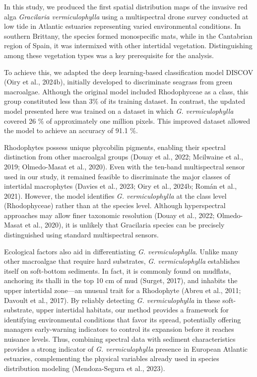 \documentclass[
  letterpaper,
  DIV=11,
  numbers=noendperiod]{scrartcl}
\begin{document}
In this study, we produced the first spatial distribution maps of the
invasive red alga \emph{Gracilaria vermiculophylla} using a
multispectral drone survey conducted at low tide in Atlantic estuaries
representing varied environmental conditions. In southern Brittany, the
species formed monospecific mats, while in the Cantabrian region of
Spain, it was intermixed with other intertidal vegetation.
Distinguishing among these vegetation types was a key prerequisite for
the analysis.

To achieve this, we adapted the deep learning-based classification model
DISCOV (Oiry et al., 2024b), initially developed to discriminate
seagrass from green macroalgae. Although the original model included
Rhodophyceae as a class, this group constituted less than 3\% of its
training dataset. In contrast, the updated model presented here was
trained on a dataset in which \emph{G. vermiculophylla} covered 26 \% of
approximately one million pixels. This improved dataset allowed the
model to achieve an accuracy of 91.1 \%.

Rhodophytes possess unique phycobilin pigments, enabling their spectral
distinction from other macroalgal groups (Douay et al., 2022; Mcilwaine
et al., 2019; Olmedo-Masat et al., 2020). Even with the ten-band
multispectral sensor used in our study, it remained feasible to
discriminate the major classes of intertidal macrophytes (Davies et al.,
2023; Oiry et al., 2024b; Román et al., 2021). However, the model
identifies \emph{G. vermiculophylla} at the class level (Rhodophyceae)
rather than at the species level. Although hyperspectral approaches may
allow finer taxonomic resolution (Douay et al., 2022; Olmedo-Masat et
al., 2020), it is unlikely that Gracilaria species can be precisely
distinguished using standard multispectral sensors.

Ecological factors also aid in differentiating \emph{G.
vermiculophylla}. Unlike many other macroalgae that require hard
substrates, \emph{G. vermiculophylla} establishes itself on soft-bottom
sediments. In fact, it is commonly found on mudflats, anchoring its
thalli in the top 10 cm of mud (Surget, 2017), and inhabits the upper
intertidal zone---an unusual trait for a Rhodophyte (Abreu et al., 2011;
Davoult et al., 2017). By reliably detecting \emph{G. vermiculophylla}
in these soft-substrate, upper intertidal habitats, our method provides
a framework for identifying environmental conditions that favor its
spread, potentially offering managers early-warning indicators to
control its expansion before it reaches nuisance levels. Thus, combining
spectral data with sediment characteristics provides a strong indicator
of \emph{G. vermiculophylla} presence in European Atlantic estuaries,
complementing the physical variables already used in species
distribution modeling (Mendoza-Segura et al., 2023).
\end{document}
